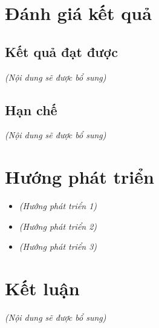 \section{Đánh giá kết quả}
\subsection{Kết quả đạt được}
\textit{(Nội dung sẽ được bổ sung)}

\subsection{Hạn chế}
\textit{(Nội dung sẽ được bổ sung)}

\section{Hướng phát triển}
\begin{itemize}
    \item \textit{(Hướng phát triển 1)}
    \item \textit{(Hướng phát triển 2)}
    \item \textit{(Hướng phát triển 3)}
\end{itemize}

\section{Kết luận}
\textit{(Nội dung sẽ được bổ sung)}
